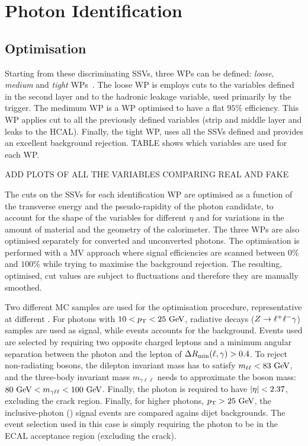 \section{Photon Identification}


\subsection{Optimisation}
\label{subsec:pid_ss:pid:optimisation}

Starting from these discriminating \acp{SSV}, three \acp{WP} can be defined: \textit{loose}, \textit{medium} and \textit{tight} \acp{WP}~\cite{ATLASEGammaPerformance2024}. The loose \ac{WP} is employs cuts to the variables defined in the second layer and to the hadronic leakage variable, used primarily by the trigger. The medimum \ac{WP} is a \ac{WP} optimised to have a flat \(95\%\) efficiency. This \ac{WP} applies cut to all the previously defined variables (strip and middle layer and leaks to the \ac{HCAL}). Finally, the tight \ac{WP}, uses all the \acp{SSV} defined and provides an excellent background rejection. TABLE shows which variables are used for each \ac{WP}.

ADD PLOTS OF ALL THE VARIABLES COMPARING REAL AND FAKE

The cuts on the \acp{SSV} for each identification \ac{WP} are optimised as a function of the transverse energy and the pseudo-rapidity of the photon candidate, to account for the shape of the variables for different \(\eta\) and for variations in the amount of material and the geometry of the calorimeter. The three \acp{WP} are also optimised separately for converted and unconverted photons.
The optimisation is performed with a \ac{MV} approach where signal efficiencies are scanned between \(0\%\) and \(100\%\) while trying to maximise the background rejection. The resulting, optimised, cut values are subject to fluctuations and therefore they are manually smoothed.

Two different \ac{MC} samples are used for the optimisation procedure, representative at different \ptgam. For photons with \(10<p_{\text{T}}<25~\text{GeV}\), radiative \Zboson decays (\(Z\rightarrow\ell^{+} \ell^{-}\gamma\)) samples are used as signal, while \Zjets events accounts for the background. Events used are selected by requiring two opposite charged leptons and a minimum angular separation between the photon and the lepton of \(\Delta R_{\text{min}}(\ell, \gamma) > 0.4\). To reject non-radiating \Zboson bosons, the dilepton invariant mass has to satisfy \(m_{\ell\ell}<83~\text{GeV}\), and the three-body invariant mass \(m_{\gamma\ell\ell}\) needs to approximate the \Zboson boson mass: \(80~\text{GeV} < m_{\gamma\ell\ell} < 100~\text{GeV}\). Finally, the photon is required to have \(|\eta|<2.37\), excluding the crack region.
Finally, for higher \pt photons, \(p_{\text{T}}>25~\text{GeV}\), the inclusive-photon (\yj) signal events are compared agains dijet backgrounds. The event selection used in this case is simply requiring the photon to be in the \ac{ECAL} acceptance region (excluding the crack).





